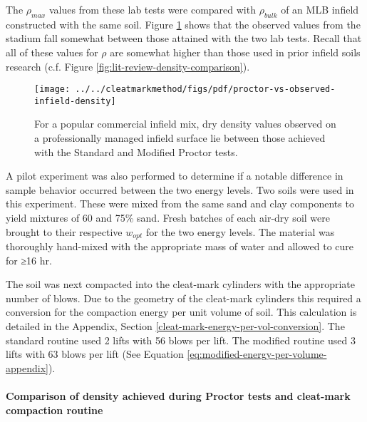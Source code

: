 \documentclass[
  letterpaper,
  openany]{book}
\begin{document}
The \(\rho_{max}\) values from these lab tests were compared with \(\rho_{bulk}\) of an MLB infield constructed with the same soil.
Figure \ref{fig:proctor-vs-observed-infield-density} shows that the observed values from the stadium fall somewhat between those attained with the two lab tests.
Recall that all of these values for \(\rho\) are somewhat higher than those used in prior infield soils research (c.f. Figure \ref{fig:lit-review-density-comparison}).



\begin{figure}

{\centering \texttt{[image: ../../cleatmarkmethod/figs/pdf/proctor-vs-observed-infield-density]} 

}

\caption[Proctor tests compared with $\rho_{bulk}$ of an actual infield]{For a popular commercial infield mix, dry density values observed on a professionally managed infield surface lie between those achieved with the Standard and Modified Proctor tests.}\label{fig:proctor-vs-observed-infield-density}
\end{figure}

A pilot experiment was also performed to determine if a notable difference in sample behavior occurred between the two energy levels.
Two soils were used in this experiment.
These were mixed from the same sand and clay components to yield mixtures of 60 and 75\% sand.
Fresh batches of each air-dry soil were brought to their respective \(w_{opt}\) for the two energy levels.
The material was thoroughly hand-mixed with the appropriate mass of water and allowed to cure for ≥16 hr.

The soil was next compacted into the cleat-mark cylinders with the appropriate number of blows.
Due to the geometry of the cleat-mark cylinders this required a conversion for the compaction energy per unit volume of soil.
This calculation is detailed in the Appendix, Section \ref{cleat-mark-energy-per-vol-conversion}.
The standard routine used 2 lifts with 56 blows per lift.
The modified routine used 3 lifts with 63 blows per lift (See Equation \eqref{eq:modified-energy-per-volume-appendix}).

\hypertarget{comparison-of-density-achieved-during-proctor-tests-and-cleat-mark-compaction-routine}{%
\paragraph{Comparison of density achieved during Proctor tests and cleat-mark compaction routine}\label{comparison-of-density-achieved-during-proctor-tests-and-cleat-mark-compaction-routine}}
\end{document}
